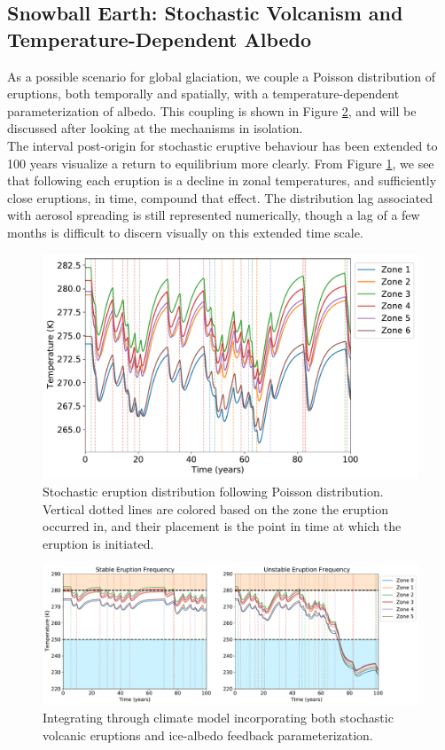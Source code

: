 \documentclass[12pt]{article}
\begin{document}
\subsection{Snowball Earth: Stochastic Volcanism and Temperature-Dependent
Albedo} As a possible scenario for global glaciation, we couple a Poisson
distribution of eruptions, both temporally and spatially, with a
temperature-dependent parameterization of albedo. This coupling is shown in
Figure \ref{fig:fireandice}, and will be discussed after looking at the
mechanisms in isolation. \\

The interval post-origin for stochastic eruptive behaviour has been extended to
100 years visualize a return to equilibrium more clearly. From Figure
\ref{fig:stocherupt}, we see that following each eruption is a decline in zonal
temperatures, and sufficiently close eruptions, in time, compound that effect.
The distribution lag associated with aerosol spreading is still represented
numerically, though a lag of a few months is difficult to discern visually on
this extended time scale. 

\begin{figure}[H]
    \centering
    \includegraphics[scale=0.6]{stochastic_eruptions.pdf}
    \caption{
        Stochastic eruption distribution following Poisson distribution.
        Vertical dotted lines are colored based on the zone the eruption
        occurred in, and their placement is the point in time at which the
        eruption is initiated.
    }
    \label{fig:stocherupt}
\end{figure}
\FloatBarrier

\begin{figure}[H]
    \centering
    \includegraphics[width=\linewidth]{eruptions_albedo.pdf}
    \caption{
        Integrating through climate model incorporating both stochastic volcanic
        eruptions and ice-albedo feedback parameterization.
    }
    \label{fig:fireandice}
\end{figure}
\FloatBarrier
\end{document}
